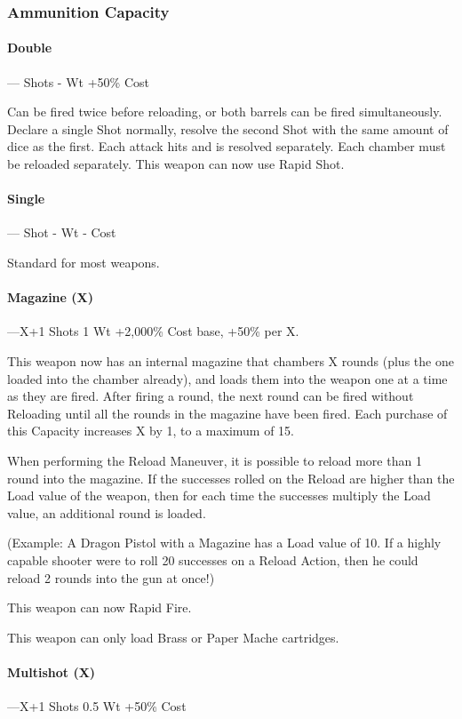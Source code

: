 \documentclass[oneside,11pt,english]{book}
\begin{document}
\subsubsection{Ammunition Capacity}
\paragraph{Double}--- Shots - Wt +50\% Cost

Can be fired twice before reloading, or both barrels can be fired simultaneously. 
Declare a single Shot normally, resolve the second Shot with the same amount of 
dice as the first. Each attack hits and is resolved separately. Each chamber must be 
reloaded separately. 
This weapon can now use Rapid Shot.


\paragraph{Single}--- Shot - Wt - Cost

Standard for most weapons.

\paragraph{Magazine (X)}---\quad X+1 Shots 1 Wt +2,000\% Cost base, +50\% per X.

This weapon now has an internal magazine that chambers X rounds (plus the one loaded into the chamber already), and loads them into the weapon one at a time as they are fired.
After firing a round, the next round can be fired without Reloading until all the rounds in the magazine have been fired. Each purchase of this Capacity increases X by 1, to a maximum of 15.

When performing the Reload Maneuver, it is possible to reload more than 1 round into the magazine. If the successes rolled on the Reload are higher than the Load value of the weapon, then for each time the successes multiply the Load value, an additional round is loaded.

(Example: A Dragon Pistol with a Magazine has a Load value of 10. If a highly capable shooter were to roll 20 successes on a Reload Action, then he could reload 2 rounds into the gun at once!)

This weapon can now Rapid Fire.

This weapon can only load Brass or Paper Mache cartridges.

\paragraph{Multishot (X)}---\quad X+1 Shots 0.5 Wt +50\% Cost
\end{document}

